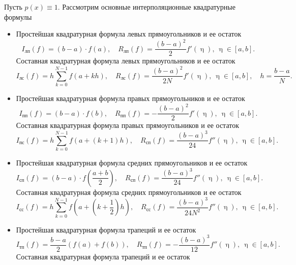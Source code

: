 \documentclass[a4paper, 12pt]{report}
\numberwithin{equation}{section}
\renewcommand{\eta}{\upeta}
\begin{document}
    Пусть $p(x)\equiv1$. Рассмотрим основные интерполяционные квадратурные формулы
    \begin{itemize}
        \item Простейшая квадратурная формула левых прямоугольников и ее остаток
         \begin{equation}
	 	I_{\text{лп}}(f) =(b-a)\cdot f(a),\quad R_\text{лп} (f) = \dfrac{(b-a)^2}{2}f'(\eta), \ \eta \in [a,b].
	 \end{equation}
     Составная квадратурная формула левых прямоугольников и ее остаток
         \begin{equation}
	 	I_\text{лс}(f)= h\sum_{k=0}^{N-1} f(a+kh),\quad R_\text{лс}(f)  = \dfrac{(b-a)^2}{2N}f'(\eta),\ \eta \in [a,b],\quad h = \dfrac{b-a}{N}.
	 \end{equation}
     \item Простейшая квадратурная формула правых прямоугольников и ее остаток
         \begin{equation}
	 	I_{\text{пп}}(f) =(b-a)\cdot f(b),\quad R_\text{пп} (f) = -\dfrac{(b-a)^2}{2}f'(\eta), \ \eta \in [a,b].
	 \end{equation}
     Составная квадратурная формула правых прямоугольников и ее остаток
         \begin{equation}
	 	I_\text{пс}(f)= h\sum_{k=0}^{N-1}f(a+(k+1)h),\quad R_\text{сп}(f)= \dfrac{(b-a)^3}{24}f''(\eta),\ \eta \in [a,b].
	 \end{equation}
     \item Простейшая квадратурная формула средних прямоугольников и ее остаток
         \begin{equation}
	 	I_\text{сп}(f) = (b-a)\cdot f\left(\dfrac{a+b}{2}\right),\quad R_\text{сп}(f) = \dfrac{(b-a)^3}{24}f''(\eta), \ \eta \in [a,b].
	 \end{equation}
     Составная квадратурная формула средних прямоугольников и ее остаток
         \begin{equation}
	 	I_\text{сс}(f) = h\sum_{k=0}^{N-1}f\left(a+\left(k+\dfrac12\right)h\right),\quad R_\text{сс}(f) = \dfrac{(b-a)^3}{24N^2}f''(\eta),\ \eta \in [a,b].
	 \end{equation}
     \item Простейшая квадратурная формула трапеций и ее остаток
         \begin{equation}
	 	I_\text{тп} (f)= \dfrac{b-a}{2}\left(f(a) + f(b)\right),\quad R_\text{тп}(f) = -\dfrac{(b-a)^3}{12}f''(\eta), \ \eta \in [a,b].
	 \end{equation}
     Составная квадратурная формула трапеций и ее остаток

\end{itemize}
\end{document}
